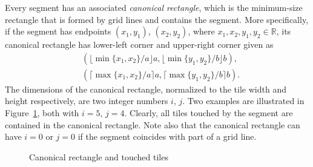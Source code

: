 \documentclass[12pt, a4paper]{article}
\begin{document}
Every segment has an associated \emph{canonical rectangle}, which is the minimum-size rectangle that is formed by grid lines and contains the segment. More specifically, if the segment has endpoints $(x_1,y_1)$, $(x_2,y_2)$, where $x_1, x_2, y_1, y_2 \in \mathbb R$, its canonical rectangle has lower-left corner and upper-right corner given as
\begin{align*}
& (\lfloor\min\{x_1, x_2\}/a\rfloor a, \lfloor\min\{y_1,y_2\}/b\rfloor b), \\
& (\lceil\max\{x_1, x_2\}/a \rceil a, \lceil\max\{y_1,y_2\}/b \rceil b).
\end{align*}
The dimensions of the canonical rectangle, normalized to the tile width and height respectively, are two integer numbers $i$, $j$. Two examples are illustrated in Figure~\ref{fig: canonical rectangle and touched tiles}, both with $i=5$, $j=4$. Clearly, all tiles touched by the segment are contained in the canonical rectangle. Note also that the canonical rectangle can have $i=0$ or $j=0$ if the segment coincides with part of a grid line.

\begin{figure}
\centering%
\hfill%
%
\caption{Canonical rectangle and touched tiles
}%
\label{fig: canonical rectangle and touched tiles}%
\end{figure}%
\end{document}
